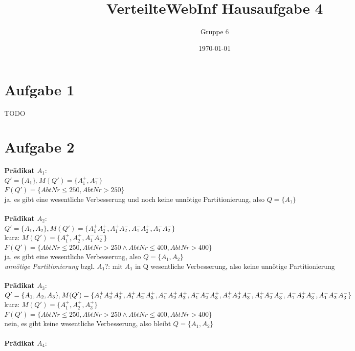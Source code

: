 \documentclass[a4paper]{article}
\author{Gruppe 6}
\title{\textbf{VerteilteWebInf Hausaufgabe 4}}
\date{\today}
\begin{document}
\maketitle

\section*{Aufgabe 1}
TODO



\section*{Aufgabe 2}
\textbf{Prädikat $ A_1 $}:\\
$ Q' = \{ A_1 \}, M(Q') = \{ A_1^+, A_1^-\} $\\
$ F(Q') = \{ AbtNr\leq 250, AbtNr>250\} $\\
ja, es gibt eine wesentliche Verbesserung und noch keine unnötige Partitionierung, also $ Q = \{ A_1 \} $\\
\\
\textbf{Prädikat $ A_2 $}:\\
$ Q' = \{ A_1, A_2 \}, M(Q') = \{ A_1^+ A_2^+, A_1^+ A_2^-, A_1^- A_2^+, A_1^- A_2^-\} $\\
kurz: $ M(Q') = \{ A_1^+, A_2^+, A_1^- A_2^-\} $\\
$ F(Q') = \{ AbtNr\leq 250, AbtNr>250 \wedge AbtNr \leq 400, AbtNr > 400 \} $\\
ja, es gibt eine wesentliche Verbesserung, also $ Q = \{ A_1, A_2 \} $ \\
\textit{unnötige Partitionierung} bzgl. $ A_1 $?: mit $ A_1 $ in Q wesentliche Verbesserung, also keine unnötige Partitionierung\\
\\
\textbf{Prädikat $ A_3 $}:\\
$ Q' = \{ A_1, A_2, A_3 \}, \\
M(Q') = \{ A_1^+ A_2^+ A_3^+, A_1^+ A_2^- A_3^+, A_1^- A_2^+ A_3^+, A_1^- A_2^- A_3^+, A_1^+ A_2^+ A_3^-, A_1^+ A_2^- A_3^-, A_1^- A_2^+ A_3^-, A_1^- A_2^- A_3^-\} $\\
kurz: $ M(Q') = \{ A_1^+, A_2^+, A_3^+ \} $\\
$ F(Q') = \{ AbtNr\leq 250, AbtNr>250 \wedge AbtNr \leq 400, AbtNr > 400 \} $\\
nein, es gibt keine wesentliche Verbesserung, also bleibt $ Q = \{ A_1, A_2 \} $ \\
\\
\textbf{Prädikat $ A_4 $}:\\
\end{document}
